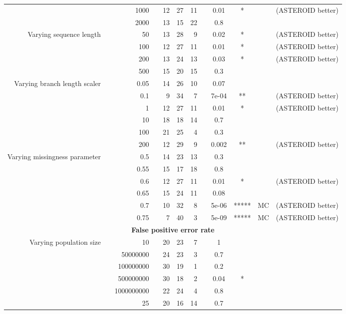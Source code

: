 \begin{table}[!h]
\begin{tabular}{r r r l r r r l c c c l}
& & 1000 & & 12 & 27 & 11 & & 0.01 & * &  & (ASTEROID better) \\
& & 2000 & & 13 & 15 & 22 & & 0.8 &  &  &  \\
\midrule
\multirow{ 4}{2cm}{Varying sequence length}
& & 50 & & 13 & 28 & 9 & & 0.02 & * &  & (ASTEROID better) \\
& & 100 & & 12 & 27 & 11 & & 0.01 & * &  & (ASTEROID better) \\
& & 200 & & 13 & 24 & 13 & & 0.03 & * &  & (ASTEROID better) \\
& & 500 & & 15 & 20 & 15 & & 0.3 &  &  &  \\
\midrule
\multirow{ 6}{2cm}{Varying branch length scaler}
& & 0.05 & & 14 & 26 & 10 & & 0.07 &  &  &  \\
& & 0.1 & & 9 & 34 & 7 & & 7e-04 & ** &  & (ASTEROID better) \\
& & 1 & & 12 & 27 & 11 & & 0.01 & * &  & (ASTEROID better) \\
& & 10 & & 18 & 18 & 14 & & 0.7 &  &  &  \\
& & 100 & & 21 & 25 & 4 & & 0.3 &  &  &  \\
& & 200 & & 12 & 29 & 9 & & 0.002 & ** &  & (ASTEROID better) \\
\midrule
\multirow{ 6}{2cm}{Varying missingness parameter}
& & 0.5 & & 14 & 23 & 13 & & 0.3 &  &  &  \\
& & 0.55 & & 15 & 17 & 18 & & 0.8 &  &  &  \\
& & 0.6 & & 12 & 27 & 11 & & 0.01 & * &  & (ASTEROID better) \\
& & 0.65 & & 15 & 24 & 11 & & 0.08 &  &  &  \\
& & 0.7 & & 10 & 32 & 8 & & 5e-06 & ***** & MC & (ASTEROID better) \\
& & 0.75 & & 7 & 40 & 3 & & 5e-09 & ***** & MC & (ASTEROID better) \\
\midrule
\multicolumn{12}{c}{\textbf{False positive error rate}} \\
\midrule
\multirow{ 6}{2cm}{Varying population size}
& & 10 & & 20 & 23 & 7 & & 1 &  &  &  \\
& & 50000000 & & 24 & 23 & 3 & & 0.7 &  &  &  \\
& & 100000000 & & 30 & 19 & 1 & & 0.2 &  &  &  \\
& & 500000000 & & 30 & 18 & 2 & & 0.04 & * &  &  \\
& & 1000000000 & & 22 & 24 & 4 & & 0.8 &  &  &  \\
\midrule
\multirow{ 6}{2cm}{Varying number of taxa}
& & 25 & & 20 & 16 & 14 & & 0.7 &  &  &  \\

\end{tabular}
\end{table}
